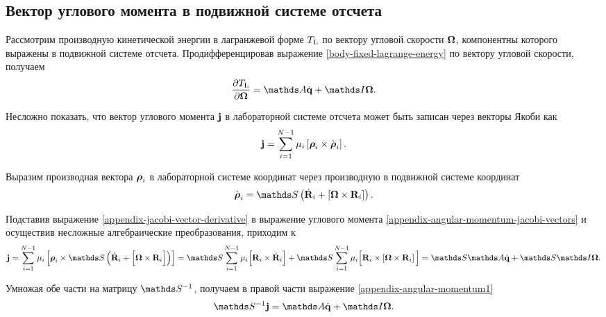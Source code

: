\begin{subappendices}
    \section{Вектор углового момента в подвижной системе отсчета} \label{appendix:angular-momentum-body-fixed}

    Рассмотрим производную кинетической энергии в лагранжевой форме $T_\text{L}$ по вектору угловой скорости $\boldsymbol{\Omega}$, компонентны которого выражены в подвижной системе отсчета. Продифференцировав выражение \eqref{body-fixed-lagrange-energy} по вектору угловой скорости, получаем 
    \begin{gather}
        \frac{\partial \Tl}{\partial \bOmega} = \bbA \dot{\mf{q}} + \bbI \bOmega. \label{appendix-angular-momentum1}
    \end{gather}

    Несложно показать, что вектор углового момента $\mathbf{j}$ в лабораторной системе отсчета может быть записан через векторы Якоби как
    \begin{gather}
        \mathbf{j} = \sum_{i = 1}^{N - 1} \mu_i \left[ \boldsymbol{\rho}_i \times \dot{\boldsymbol{\rho}}_i \right]. \label{appendix-angular-momentum-jacobi-vectors}
    \end{gather}

    Выразим производная вектора $\boldsymbol{\rho}_i$ в лабораторной системе координат через производную в подвижной системе координат \cite{goldstein}
    \begin{gather}
        \dot{\bs{\rho}}_i = \bbS \lb \dot{\mf{R}}_i + \lsq \bs{\Omega} \times \mf{R}_i \rsq \rb. \label{appendix-jacobi-vector-derivative} 
    \end{gather}

    Подставив выражение \eqref{appendix-jacobi-vector-derivative} в выражение углового момента \eqref{appendix-angular-momentum-jacobi-vectors} и осуществив несложные алгебраические преобразования, приходим к 
    \begin{gather}
        \mf{j} = \sum_{i = 1}^{N-1} \mu_i \lsq \bs{\rho}_i \times \bbS \lb \dot{\mf{R}}_i + \Big[ \bOmega \times \mf{R}_i \Big] \rb \rsq = \bbS \sum_{i = 1}^{N-1} \mu_i \Big[ \mf{R}_i \times \dot{\mf{R}}_i \Big] + \bbS \sum_{i = 1}^{N-1} \mu_i \Big[ \mf{R}_i \times \lsq \bOmega \times \mf{R}_i \rsq \Big] = \bbS \bbA \dot{\mf{q}} + \bbS \bbI \bOmega.
    \end{gather}

    Умножая обе части на матрицу $\bbS^{-1}$, получаем в правой части выражение \eqref{appendix-angular-momentum1}
    \begin{gather}
        \bbS^{-1} \mf{j} = \bbA \dot{\mf{q}} + \bbI \bOmega.
    \end{gather}


\end{subappendices}
